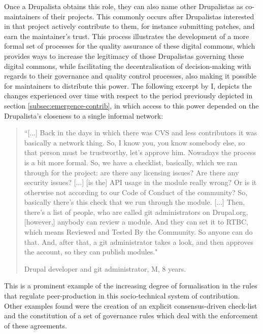 Once a Drupalista obtains this role, they can also name other Drupalistas as co-maintainers of their projects. This commonly occurs after Drupalistas interested in that project actively contribute to them, for instance submitting patches, and earn the maintainer's trust. This process illustrates the development of a more formal set of processes for the quality assurance of these digital commons, which provides ways to increase the legitimacy of those Drupalistas governing these digital commons, while facilitating the decentralisation of decision-making with regards to their governance and quality control processes, also making it possible for maintainers to distribute this power. The following excerpt by I, depicts the changes experienced over time with respect to the period previously depicted in section \ref{subsec:emergence-contrib}, in which access to this power depended on the Drupalista's closeness to a single informal network:

\begin{quotation}
``[...] Back in the days in which there was CVS and less contributors it was basically a network thing. So, I know you, you know somebody else, so that person must be trustworthy, let's approve him. Nowadays the process is a bit more formal. So, we have a checklist, basically, which we ran through for the project: are there any licensing issues? Are there any security issues? [...] [is the] API usage in the module really wrong? Or is it otherwise not according to our Code of Conduct of the community? So, basically there's this check that we run through the module. [...] Then, there's a list of people, who are called git administrators on Drupal.org, [however,] anybody can review a module. And they can set it to RTBC, which means Reviewed and Tested By the Community. So anyone can do that. And, after that, a git administrator takes a look, and then approves the account, so they can publish modules."

\begin{flushright}\footnotesize{Drupal developer and git administrator, M, 8 years.}\end{flushright}
\end{quotation}

This is a prominent example of the increasing degree of formalisation in the rules that regulate peer-production in this socio-technical system of contribution. Other examples found were the creation of an explicit consensus-driven check-list \parencite{drupalorg-pap:2016:Online} and the constitution of a set of governance rules which deal with the enforcement of these agreements.

